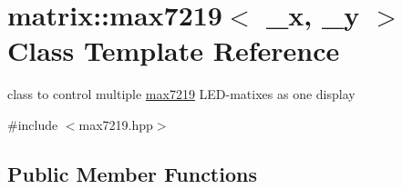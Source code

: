 \hypertarget{classmatrix_1_1max7219}{}\section{matrix\+:\+:max7219$<$ \+\_\+x, \+\_\+y $>$ Class Template Reference}
\label{classmatrix_1_1max7219}


class to control multiple \mbox{\hyperlink{classmatrix_1_1max7219}{max7219}} L\+E\+D-\/matixes as one display  




{\ttfamily \#include $<$max7219.\+hpp$>$}

\subsection*{Public Member Functions}
